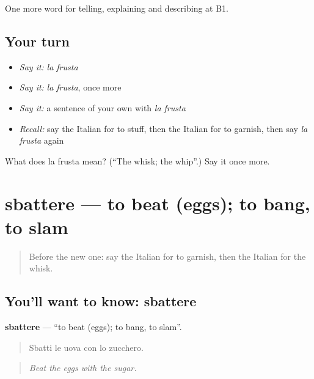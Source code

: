 \begin{grammarlens}[title={What you've built}]
One more word for telling, explaining and describing at B1.
\end{grammarlens}

\subsection*{Your turn}
\begin{itemize}
\raggedright
  \item \emph{Say it:} \emph{la frusta}
  \item \emph{Say it:} \emph{la frusta}, once more
  \item \emph{Say it:} a sentence of your own with \emph{la frusta}
  \item \emph{Recall:} say the Italian for to stuff, then the Italian for to garnish, then say \emph{la frusta} again
\end{itemize}

\begin{tcolorbox}[breakable,colback=teal!4,colframe=teal!35!black,title={Before you move on}]
What does la frusta mean? (\textquotedblleft{}The whisk; the whip\textquotedblright{}.) Say it once more.
\end{tcolorbox}
\section[sbattere]{sbattere — to beat (eggs); to bang, to slam}

\label{lesson:IT-C338-sbattere}



\begin{quote}
Before the new one: say the Italian for to garnish, then the Italian for the whisk.
\end{quote}

\subsection*{You'll want to know: sbattere}
\textbf{sbattere} — \textquotedblleft{}to beat (eggs); to bang, to slam\textquotedblright{}.

\begin{quote}
Sbatti le uova con lo zucchero.
\end{quote}

\begin{quote}
\emph{Beat the eggs with the sugar.}
\end{quote}

